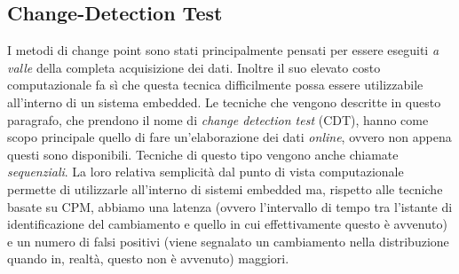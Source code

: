 \subsection{Change-Detection Test}
I metodi di change point sono stati principalmente
pensati per essere eseguiti \textit{a valle} della
completa acquisizione dei dati. Inoltre il suo elevato
costo computazionale fa s\`i che questa tecnica
difficilmente possa essere utilizzabile all'interno di
un sistema embedded. Le tecniche che vengono descritte
in questo paragrafo, che prendono il nome di
\textit{change detection test} (CDT), hanno come scopo
principale quello di fare un'elaborazione dei dati
\textit{online}, ovvero non appena questi sono
disponibili. Tecniche di questo tipo vengono anche
chiamate \textit{sequenziali}. La loro
relativa semplicit\`a dal punto di vista
computazionale permette di utilizzarle all'interno di
sistemi embedded ma, rispetto alle tecniche basate su
CPM, abbiamo una latenza (ovvero l'intervallo di tempo
tra l'istante di identificazione del cambiamento e
quello in cui effettivamente questo \`e avvenuto) e un
numero di falsi positivi (viene segnalato un
cambiamento nella distribuzione quando in, realt\`a,
questo non \`e avvenuto) maggiori.
